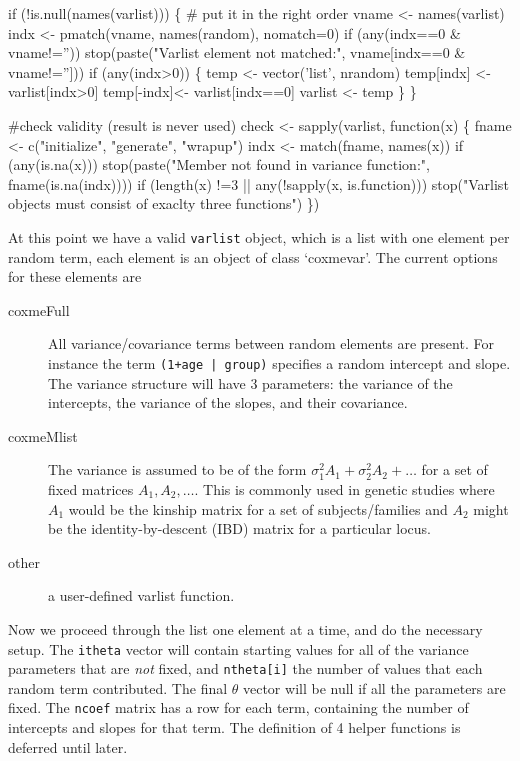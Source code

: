 \documentclass{article}
\begin{document}
if (!is.null(names(varlist))) \{ # put it in the right order
    vname <- names(varlist)
    indx <- pmatch(vname, names(random), nomatch=0)
    if (any(indx==0 & vname!=''))
        stop(paste("Varlist element not matched:", vname[indx==0 & vname!='']))
    if (any(indx>0)) \{
        temp <- vector('list', nrandom)
        temp[indx] <- varlist[indx>0]
        temp[-indx]<- varlist[indx==0]
        varlist <- temp
        \}
    \}
    
#check validity (result is never used)
check <- sapply(varlist, function(x) \{
       fname <- c("initialize", "generate", "wrapup")
       indx <- match(fname, names(x))
       if (any(is.na(x)))
           stop(paste("Member not found in variance function:",
                      fname(is.na(indx))))
       if (length(x) !=3 || any(!sapply(x, is.function)))
           stop("Varlist objects must consist of exaclty three functions")
   \})

\nwendcode{}\nwdocspar
At this point we have a valid {\tt{}varlist} object, which is a list with
one element per random term, each element is an object of class `coxmevar'. %
The current options for these elements are
\begin{description}
\item [coxmeFull] All variance/covariance terms between random elements are
present.  For instance the term {\tt{}(1+age\ |\ group)} specifies a random
intercept and slope.  The variance structure will have 3 parameters: the variance of the intercepts, the
variance of the slopes, and their covariance.
\item [coxmeMlist]  The variance is assumed to be of the form
$\sigma_1^2 A_1 + \sigma_2^2 A_2 + \ldots$ for a set of fixed matrices
$A_1, A_2, \ldots$.  This is commonly used in genetic studies where $A_1$
would be the kinship matrix for a set of subjects/families and $A_2$ might
be the identity-by-descent (IBD) matrix for a particular locus.
\item [other] a user-defined varlist function.
\end{description}

Now we proceed through the list one element at a time, and do the necessary
setup.
The {\tt{}itheta} vector will contain starting values for all of the
variance parameters that are \emph{not} fixed, and {\tt{}ntheta[i]} the
number of values that each random term contributed.
The final $\theta$ vector will be null if all the parameters are fixed. 
The {\tt{}ncoef} matrix has a row for each term, containing the number
of intercepts and slopes for that term.  
The definition of 4 helper functions is deferred until later.
\end{document}
